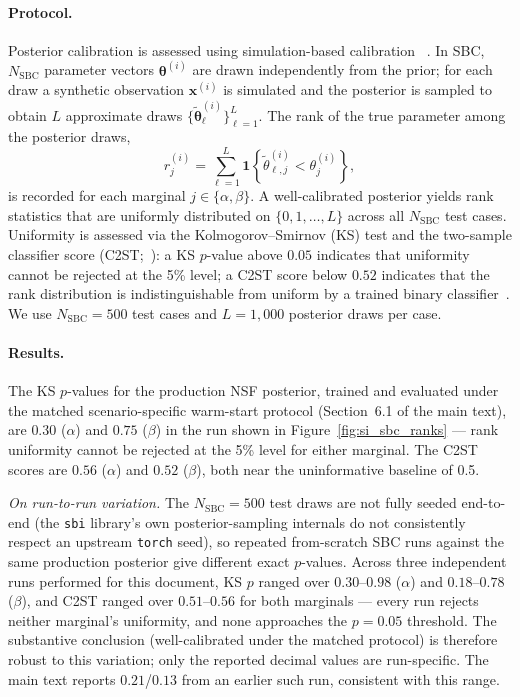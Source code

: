 \documentclass[aps,pre,twocolumn,superscriptaddress]{revtex4-2}
\begin{document}
\paragraph{Protocol.}
Posterior calibration is assessed using simulation-based calibration~%
\citep{Talts2018}.  In SBC, $N_\mathrm{SBC}$ parameter vectors
$\boldsymbol{\theta}^{(i)}$ are drawn independently from the prior; for each draw
a synthetic observation $\mathbf{x}^{(i)}$ is simulated and the posterior is sampled
to obtain $L$ approximate draws $\{\tilde{\boldsymbol{\theta}}^{(i)}_\ell\}_{\ell=1}^L$.
The rank of the true parameter among the posterior draws,
%
\begin{equation}
  r^{(i)}_j
  = \sum_{\ell=1}^{L}
    \mathbf{1}\!\left\{\tilde{\theta}^{(i)}_{\ell,j} < \theta^{(i)}_j\right\},
\end{equation}
%
is recorded for each marginal $j\in\{\alpha,\beta\}$.  A well-calibrated posterior
yields rank statistics that are uniformly distributed on $\{0,1,\ldots,L\}$ across
all $N_\mathrm{SBC}$ test cases.  Uniformity is assessed via the
Kolmogorov--Smirnov (KS) test and the two-sample classifier score
(C2ST;~\citealt{LopezPaz2017}): a KS $p$-value above $0.05$ indicates that
uniformity cannot be rejected at the 5\% level; a C2ST score below $0.52$ indicates
that the rank distribution is indistinguishable from uniform by a trained binary
classifier~\citep{TejeroCantero2020}.  We use $N_\mathrm{SBC}=500$ test cases and
$L=1{,}000$ posterior draws per case.

\paragraph{Results.}
The KS $p$-values for the production NSF posterior, trained and evaluated under the
matched scenario-specific warm-start protocol (Section~6.1 of the main text), are
$0.30$ ($\alpha$) and $0.75$ ($\beta$) in the run shown in
Figure~\ref{fig:si_sbc_ranks} --- rank uniformity cannot be rejected at the 5\% level
for either marginal. The C2ST scores are $0.56$ ($\alpha$) and $0.52$ ($\beta$), both
near the uninformative baseline of 0.5.

\textit{On run-to-run variation.} The $N_\mathrm{SBC}=500$ test draws are not fully
seeded end-to-end (the \texttt{sbi} library's own posterior-sampling internals do not
consistently respect an upstream \texttt{torch} seed), so repeated from-scratch SBC
runs against the same production posterior give different exact $p$-values. Across
three independent runs performed for this document, KS $p$ ranged over
$0.30$--$0.98$ ($\alpha$) and $0.18$--$0.78$ ($\beta$), and C2ST ranged over
$0.51$--$0.56$ for both marginals --- every run rejects neither marginal's
uniformity, and none approaches the $p=0.05$ threshold. The substantive conclusion
(well-calibrated under the matched protocol) is therefore robust to this variation;
only the reported decimal values are run-specific. The main text reports $0.21$/$0.13$
from an earlier such run, consistent with this range.
\end{document}
